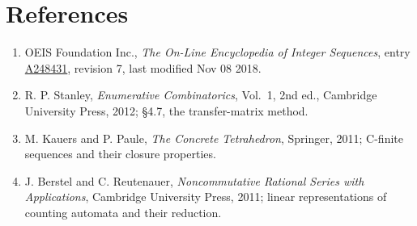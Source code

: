 \documentclass[11pt]{article}
\theoremstyle{definition}
\begin{document}
\section{References}

\begin{enumerate}

\item OEIS Foundation Inc., \emph{The On-Line Encyclopedia of Integer Sequences}, entry \href{https://oeis.org/A248431}{A248431}, revision 7, last modified Nov 08 2018.

\item R. P. Stanley, \emph{Enumerative Combinatorics}, Vol.~1, 2nd ed., Cambridge University Press, 2012; \S4.7, the transfer-matrix method.

\item M. Kauers and P. Paule, \emph{The Concrete Tetrahedron}, Springer, 2011; C-finite sequences and their closure properties.

\item J. Berstel and C. Reutenauer, \emph{Noncommutative Rational Series with Applications}, Cambridge University Press, 2011; linear representations of counting automata and their reduction.

\end{enumerate}
\end{document}
